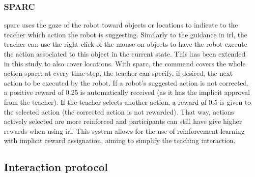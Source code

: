 \subsubsection{SPARC}

\gls{sparc} uses the gaze of the robot toward objects or locations to indicate to the teacher which action the robot is suggesting. Similarly to the guidance in \gls{irl}, the teacher can use the right click of the mouse on objects to have the robot execute the action associated to this object in the current state. This has been extended in this study to also cover locations. With \gls{sparc}, the command covers the whole action space: at every time step, the teacher can specify, if desired, the next action to be executed by the robot. If a robot's suggested action is not corrected, a positive reward of 0.25 is automatically received (as it has the implicit approval from the teacher). If the teacher selects another action, a reward of 0.5 is given to the selected action (the corrected action is not rewarded). That way, actions actively selected are more reinforced and participants can still have give higher rewards when using \gls{irl}. This system allows for the use of reinforcement learning with implicit reward assignation, aiming to simplify the teaching interaction.

\subsection{Interaction protocol}

